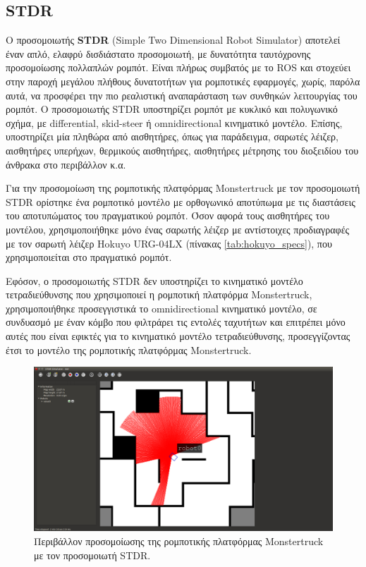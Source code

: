 \subsection{STDR}
Ο προσομοιωτής \textbf{STDR} (Simple Two Dimensional Robot Simulator) αποτελεί έναν απλό, ελαφρύ δισδιάστατο προσομοιωτή, με δυνατότητα ταυτόχρονης προσομοίωσης πολλαπλών ρομπότ. Είναι πλήρως συμβατός με το ROS και στοχεύει στην παροχή μεγάλου πλήθους δυνατοτήτων για ρομποτικές εφαρμογές, χωρίς, παρόλα αυτά, να προσφέρει την πιο ρεαλιστική αναπαράσταση των συνθηκών λειτουργίας του ρομπότ. Ο προσομοιωτής STDR υποστηρίζει ρομπότ με κυκλικό και πολυγωνικό σχήμα, με differential, skid-steer ή omnidirectional κινηματικό μοντέλο. Επίσης, υποστηρίζει μία πληθώρα από αισθητήρες, όπως για παράδειγμα, σαρωτές λέιζερ, αισθητήρες υπερήχων, θερμικούς αισθητήρες, αισθητήρες μέτρησης του διοξειδίου του άνθρακα στο περιβάλλον κ.α. 

\bigskip
Για την προσομοίωση της ρομποτικής πλατφόρμας Monstertruck με τον προσομοιωτή STDR ορίστηκε ένα ρομποτικό μοντέλο με ορθογωνικό αποτύπωμα με τις διαστάσεις του αποτυπώματος του πραγματικού ρομπότ. Όσον αφορά τους αισθητήρες του μοντέλου, χρησιμοποιήθηκε μόνο ένας σαρωτής λέιζερ με αντίστοιχες προδιαγραφές με τον σαρωτή λέιζερ Hokuyo URG-04LX  (πίνακας \ref{tab:hokuyo_specs}), που χρησιμοποιείται στο πραγματικό ρομπότ.

\bigskip
Εφόσον, ο προσομοιωτής STDR δεν υποστηρίζει το κινηματικό μοντέλο τετραδιεύθυνσης που χρησιμοποιεί η ρομποτική πλατφόρμα Monstertruck, χρησιμοποιήθηκε προσεγγιστικά το omnidirectional κινηματικό μοντέλο, σε συνδυασμό με έναν κόμβο που φιλτράρει τις εντολές ταχυτήτων και επιτρέπει μόνο αυτές που είναι εφικτές για το κινηματικό μοντέλο τετραδιεύθυνσης, προσεγγίζοντας έτσι το μοντέλο της ρομποτικής πλατφόρμας Monstertruck.

\begin{figure}[!ht]
	\centering
	\includegraphics[width=\linewidth]{Chapters/Chapter4/Figures/stdr_simulator.png}
	\caption{Περιβάλλον προσομοίωσης της ρομποτικής πλατφόρμας Monstertruck με τον προσομοιωτή STDR.}
	\label{fig:stdr_simulator}
\end{figure}

